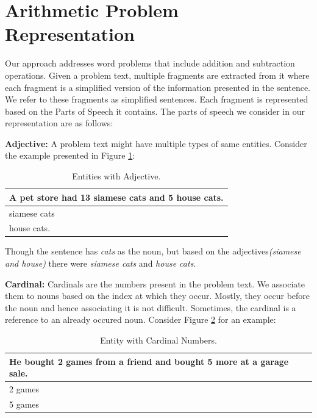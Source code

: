 \documentclass[11pt]{article}
\begin{document}
\section{Arithmetic Problem Representation}\label{sec:problemrepresentation}

Our approach addresses word problems that include addition and subtraction operations. Given a problem text, multiple fragments are extracted from it  where each fragment is a simplified version of the information presented in the sentence. We refer to these fragments as simplified sentences. Each fragment is represented based on the Parts of Speech it contains. The parts of speech we consider in our representation are as follows:


\textbf{Adjective:} A problem text might have multiple types of same entities. Consider the example presented in Figure \ref{figure:2}:

 \begin{table}[h!]
\centering
\begin{tabular}{ | m{25em} | }
\hline
 \textbf{A pet store had 13 siamese cats and 5 house cats.}\\
\hline
 siamese cats\\
\hline
house cats.\\
\hline
\end{tabular}
\caption{Entities with Adjective.}
\label{figure:2}
\end{table}

Though the sentence has \textit{cats} as the noun, but based on the adjectives\textit{(siamese and house)} there were \textit{siamese cats} and \textit{house cats}.
\vspace{4mm}

\textbf{Cardinal:} Cardinals are the numbers present in the problem text. We associate them to nouns based on the index at which they occur. Mostly, they occur before the noun and hence associating it is not difficult. Sometimes, the cardinal is a reference to an already occured noun. Consider Figure \ref{figure:3} for an example:

\begin{table}[h!]
\centering
\begin{tabular}{ | m{25em} | }
\hline
\textbf{He bought 2 games from a friend and bought 5 more at a garage sale.}\\
\hline
2 games\\
\hline
5 games\\
\hline
\end{tabular}
\caption{Entity with Cardinal Numbers.}
\label{figure:3}
\end{table}
\end{document}
